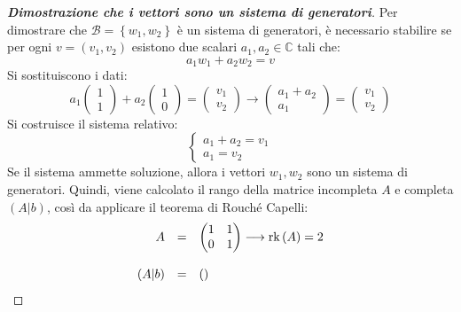 \documentclass[a4paper]{article}
\makeatletter
\DeclareMathOperator{\rk}{rk}
\newenvironment{rowequmat}[1]{\left(\array{@{}#1@{}}}{\endarray\right)}
\makeatother
\begin{document}
	\begin{proof}[\textbf{Dimostrazione che i vettori sono un sistema di generatori}]
		Per dimostrare che $\mathscr{B} = \left\{w_{1}, w_{2}\right\}$ è un sistema di generatori, è necessario stabilire se per ogni $v = \left(v_{1}, v_{2}\right)$ esistono due scalari $a_{1}, a_{2} \in \mathbb{C}$ tali che:
		\begin{equation*}
			a_{1} w_{1} + a_{2} w_{2} = v
		\end{equation*}
		Si sostituiscono i dati:
		\begin{equation*}
			a_{1} \begin{pmatrix}
				1 \\ 1
			\end{pmatrix} +
			a_{2} \begin{pmatrix}
				1 \\ 0
			\end{pmatrix} =
			\begin{pmatrix}
				v_{1} \\ v_{2}
			\end{pmatrix} \longrightarrow
			\begin{pmatrix}
				a_{1} + a_{2} \\
				a_{1}
			\end{pmatrix} = 
			\begin{pmatrix}
				v_{1} \\ v_{2}
			\end{pmatrix}
		\end{equation*}
		Si costruisce il sistema relativo:
		\begin{equation*}
			\begin{cases}
				a_{1} + a_{2} = v_{1} \\
				a_{1} = v_{2}
			\end{cases}
		\end{equation*}
		Se il sistema ammette soluzione, allora i vettori $w_{1}, w_{2}$ sono un sistema di generatori. Quindi, viene calcolato il rango della matrice incompleta $A$ e completa $\left(A|b\right)$, così da applicare il teorema di Rouché Capelli:
		\begin{equation*}
			\begin{array}{rll}
				A &=& \begin{rowequmat}{cc}
					1 & 1 \\ 0 & 1
				\end{rowequmat} \longrightarrow \rk\left(A\right) = 2 \\ [1.8em]
				\left(A|b\right) &=& \begin{rowequmat}{cc|c}

\end{rowequmat}
\end{array}
\end{equation*}
\end{proof}
\end{document}

